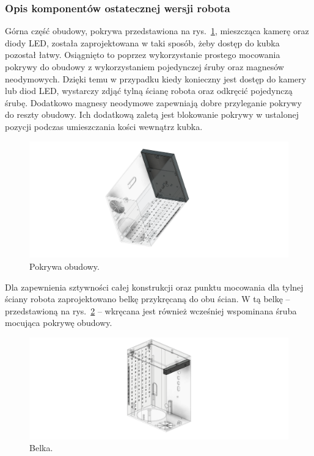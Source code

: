 \subsubsection{Opis komponentów ostatecznej wersji robota}

Górna część obudowy, pokrywa przedstawiona na rys.~\ref{fig:pokrywa}, mieszcząca kamerę oraz diody LED, została zaprojektowana w taki sposób, żeby dostęp do kubka pozostał łatwy. Osiągnięto to
poprzez wykorzystanie prostego mocowania pokrywy do obudowy z wykorzystaniem pojedynczej śruby oraz magnesów neodymowych. Dzięki temu w przypadku kiedy konieczny
jest dostęp do kamery lub diod LED, wystarczy zdjąć tylną ścianę robota oraz odkręcić pojedynczą śrubę. Dodatkowo magnesy neodymowe zapewniają
dobre przyleganie pokrywy do reszty obudowy. Ich dodatkową zaletą jest blokowanie pokrywy w ustalonej pozycji podczas umieszczania kości wewnątrz
kubka.

\begin{figure}[H]
    \centering
    \includegraphics[width=0.95\linewidth]{chapters/03-praca-wlasna/figures/pokrywa}
    \caption{\label{fig:pokrywa}Pokrywa obudowy.}
\end{figure}

Dla zapewnienia sztywności całej konstrukcji oraz punktu mocowania dla tylnej ściany robota zaprojektowano belkę przykręcaną do obu ścian. W tą belkę -- przedstawioną na rys.~\ref{fig:belka} --
wkręcana jest również wcześniej wspominana śruba mocująca pokrywę obudowy.

\begin{figure}[H]
    \centering
    \includegraphics[width=0.95\linewidth]{chapters/03-praca-wlasna/figures/belka}
    \caption{\label{fig:belka}Belka.}
\end{figure}


